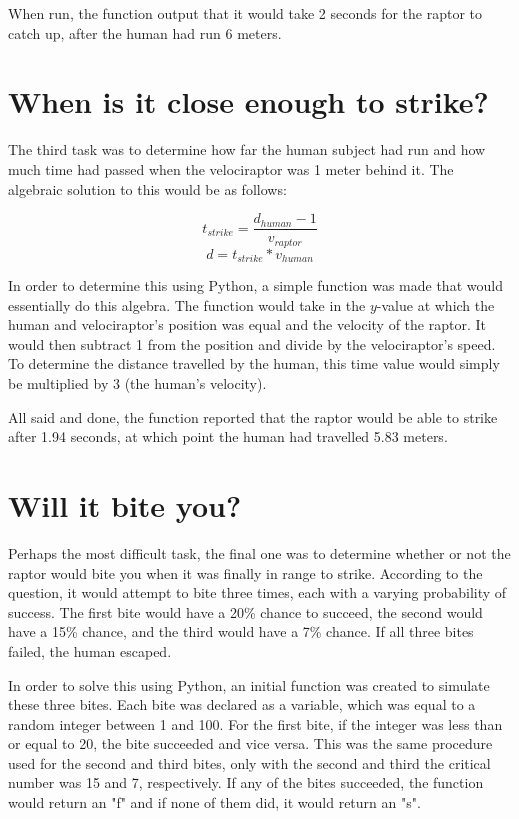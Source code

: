 \documentclass[twocolumn]{revtex4}
\begin{document}
	When run, the function output that it would take 2 seconds for the raptor to catch up, after the human had run 6 meters.
\section{When is it close enough to strike?}

	The third task was to determine how far the human subject had run and how much time had passed when the velociraptor was 1 meter behind it. The algebraic solution to this would be as follows:
	
	$$t_{strike}=\frac{d_{human}-1}{v_{raptor}}$$
	$$d=t_{strike}*v_{human}$$
	
	In order to determine this using Python, a simple function was made that would essentially do this algebra. The function would take in the $y$-value at which the human and velociraptor's position was equal and the velocity of the raptor. It would then subtract 1 from the position and divide by the velociraptor's speed. To determine the distance travelled by the human, this time value would simply be multiplied by 3 (the human's velocity).
	
	All said and done, the function reported that the raptor would be able to strike after 1.94 seconds, at which point the human had travelled 5.83 meters.

\section{Will it bite you?}

	Perhaps the most difficult task, the final one was to determine whether or not the raptor would bite you when it was finally in range to strike. According to the question, it would attempt to bite three times, each with a varying probability of success. The first bite would have a 20\% chance to succeed, the second would have a 15\% chance, and the third would have a 7\% chance. If all three bites failed, the human escaped.
	
	In order to solve this using Python, an initial function was created to simulate these three bites. Each bite was declared as a variable, which was equal to a random integer between 1 and 100. For the first bite, if the integer was less than or equal to 20, the bite succeeded and vice versa. This was the same procedure used for the second and third bites, only with the second and third the critical number was 15 and 7, respectively. If any of the bites succeeded, the function would return an "f" and if none of them did, it would return an "s".
	
\end{document}
